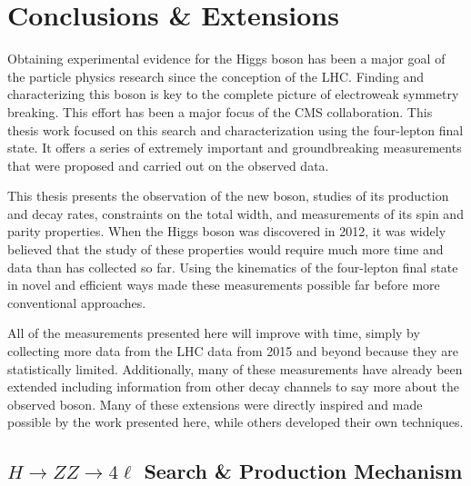 \chapter{Conclusions \& Extensions}
\label{sec:Conclusions}

Obtaining experimental evidence for the Higgs boson has been a major goal of the particle physics research since the conception of the LHC. Finding and characterizing this boson is key to the complete picture of electroweak symmetry breaking. This effort has been a major focus of the CMS collaboration. This thesis work focused on this search and characterization using the four-lepton final state. It offers a series of extremely important and groundbreaking measurements that were proposed and carried out on the observed data.

This thesis presents the observation of the new boson, studies of its production and decay rates, constraints on the total width, and measurements of its spin and parity properties. When the Higgs boson was discovered in 2012, it was widely believed that the study of these properties would require much more time and data than has collected so far. Using the kinematics of the four-lepton final state in novel and efficient ways made these measurements possible far before more conventional approaches.

All of the measurements presented here will improve with time, simply by collecting more data from the LHC data from 2015 and beyond because they are statistically limited. Additionally, many of these measurements have already been extended including information from other decay channels to say more about the observed boson. Many of these extensions were directly inspired and made possible by the work presented here, while others developed their own techniques.

\section{\texorpdfstring{$H \to ZZ \to 4\ell$}{H to ZZ to 4l} Search \& Production Mechanism}
\label{sec:Summary_ProducitonDecay}

